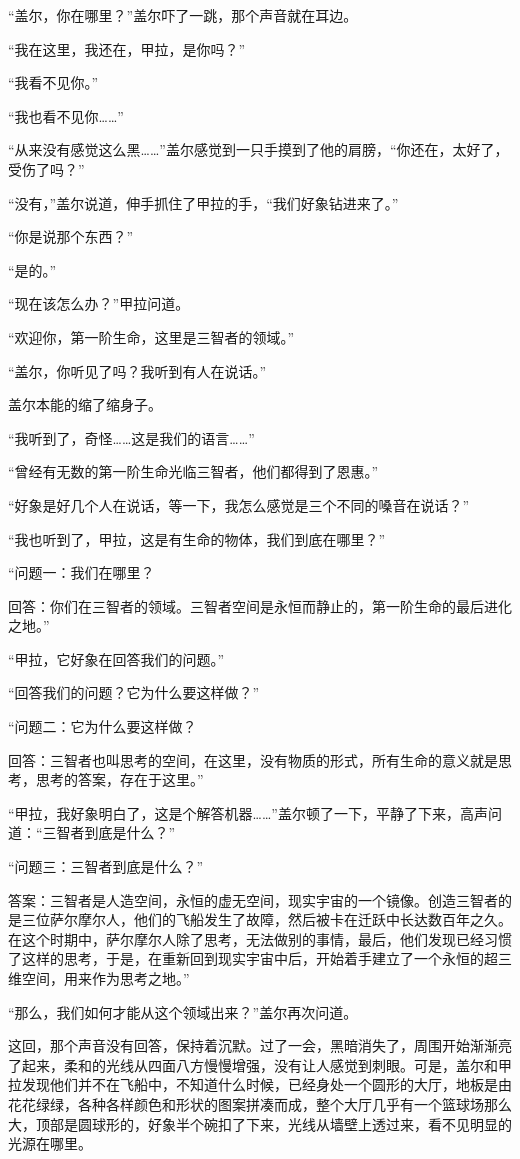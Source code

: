 “盖尔，你在哪里？”盖尔吓了一跳，那个声音就在耳边。 

“我在这里，我还在，甲拉，是你吗？” 

“我看不见你。” 

“我也看不见你……” 

“从来没有感觉这么黑……”盖尔感觉到一只手摸到了他的肩膀，“你还在，太好了，受伤了吗？” 

“没有，”盖尔说道，伸手抓住了甲拉的手，“我们好象钻进来了。” 

“你是说那个东西？” 

“是的。” 

“现在该怎么办？”甲拉问道。 

“欢迎你，第一阶生命，这里是三智者的领域。” 

“盖尔，你听见了吗？我听到有人在说话。” 

盖尔本能的缩了缩身子。 

“我听到了，奇怪……这是我们的语言……” 

“曾经有无数的第一阶生命光临三智者，他们都得到了恩惠。” 

“好象是好几个人在说话，等一下，我怎么感觉是三个不同的嗓音在说话？” 

“我也听到了，甲拉，这是有生命的物体，我们到底在哪里？” 

“问题一：我们在哪里？ 

回答：你们在三智者的领域。三智者空间是永恒而静止的，第一阶生命的最后进化之地。” 

“甲拉，它好象在回答我们的问题。” 

“回答我们的问题？它为什么要这样做？” 

“问题二：它为什么要这样做？ 

回答：三智者也叫思考的空间，在这里，没有物质的形式，所有生命的意义就是思考，思考的答案，存在于这里。” 

“甲拉，我好象明白了，这是个解答机器……”盖尔顿了一下，平静了下来，高声问道：“三智者到底是什么？” 

“问题三：三智者到底是什么？” 

答案：三智者是人造空间，永恒的虚无空间，现实宇宙的一个镜像。创造三智者的是三位萨尔摩尔人，他们的飞船发生了故障，然后被卡在迁跃中长达数百年之久。在这个时期中，萨尔摩尔人除了思考，无法做别的事情，最后，他们发现已经习惯了这样的思考，于是，在重新回到现实宇宙中后，开始着手建立了一个永恒的超三维空间，用来作为思考之地。” 

“那么，我们如何才能从这个领域出来？”盖尔再次问道。 

这回，那个声音没有回答，保持着沉默。过了一会，黑暗消失了，周围开始渐渐亮了起来，柔和的光线从四面八方慢慢增强，没有让人感觉到刺眼。可是，盖尔和甲拉发现他们并不在飞船中，不知道什么时候，已经身处一个圆形的大厅，地板是由花花绿绿，各种各样颜色和形状的图案拼凑而成，整个大厅几乎有一个篮球场那么大，顶部是圆球形的，好象半个碗扣了下来，光线从墙壁上透过来，看不见明显的光源在哪里。 

